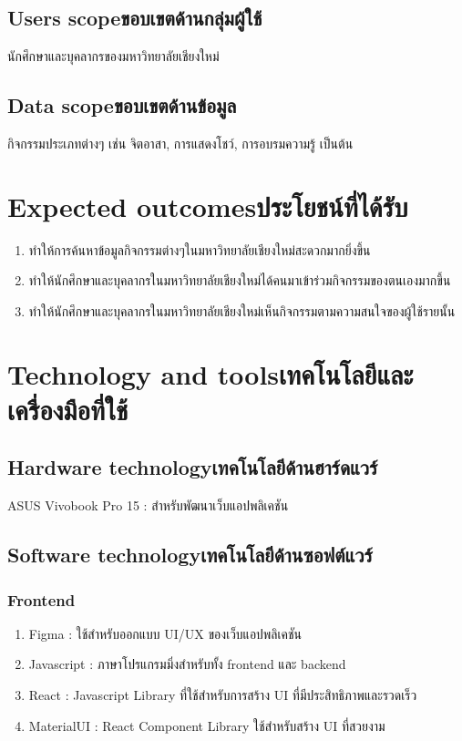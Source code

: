 \subsection{\ifenglish Users scope\else ขอบเขตด้านกลุ่มผู้ใช้\fi}
นักศึกษาและบุคลากรของมหาวิทยาลัยเชียงใหม่
\subsection{\ifenglish Data scope\else ขอบเขตด้านข้อมูล\fi}
กิจกรรมประเภทต่างๆ เช่น จิตอาสา, การแสดงโชว์, การอบรมความรู้ เป็นต้น 
\section{\ifenglish Expected outcomes\else ประโยชน์ที่ได้รับ\fi}
\begin{enumerate}
    \item ทำให้การค้นหาข้อมูลกิจกรรมต่างๆในมหาวิทยาลัยเชียงใหม่สะดวกมากยิ่งขึ้น
    \item ทำให้นักศึกษาและบุคลากรในมหาวิทยาลัยเชียงใหม่ได้คนมาเข้าร่วมกิจกรรมของตนเองมากขึ้น
    \item ทำให้นักศึกษาและบุคลากรในมหาวิทยาลัยเชียงใหม่เห็นกิจกรรมตามความสนใจของผู้ใช้รายนั้น
\end{enumerate}
\section{\ifenglish Technology and tools\else เทคโนโลยีและเครื่องมือที่ใช้\fi}

\subsection{\ifenglish Hardware technology\else เทคโนโลยีด้านฮาร์ดแวร์\fi}
ASUS Vivobook Pro 15 : สำหรับพัฒนาเว็บแอปพลิเคชัน
\subsection{\ifenglish Software technology\else เทคโนโลยีด้านซอฟต์แวร์\fi}
\subsubsection{Frontend}
\begin{enumerate}
    \item Figma\cite{figma} : ใช้สำหรับออกแบบ UI/UX ของเว็บแอปพลิเคชัน 
    \item Javascript\cite{javascript1} : ภาษาโปรแกรมมิ่งสำหรับทั้ง frontend และ backend
    \item React\cite{react1} : Javascript Library ที่ใช้สำหรับการสร้าง UI ที่มีประสิทธิภาพและรวดเร็ว  
    \item MaterialUI\cite{mui} : React Component Library ใช้สำหรับสร้าง UI ที่สวยงาม
    
\end{enumerate}

